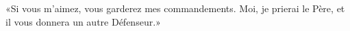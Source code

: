 \encetemps \jesusdisciples
	«Si vous m’aimez, vous garderez mes commandements.
Moi, je prierai le Père, et il vous donnera un autre Défenseur.»
